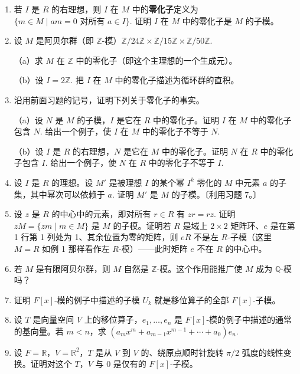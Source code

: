 \begin{enumerate}
\item 若 \(I\) 是 \(R\) 的右理想，则 \(I\) 在 \(M\) 中的\textbf{零化子}定义为 \(\{m \in M \mid am = 0 \text{ 对所有 } a \in I\}\). 证明 \(I\) 在 \(M\) 中的零化子是 \(M\) 的子模。

\item 设 \(M\) 是阿贝尔群（即 \(\mathbb{Z}\)-模）\(\mathbb{Z}/24\mathbb{Z} \times \mathbb{Z}/15\mathbb{Z} \times \mathbb{Z}/50\mathbb{Z}\).

（a）求 \(M\) 在 \(\mathbb{Z}\) 中的零化子（即这个主理想的一个生成元）。

（b）设 \(I = 2\mathbb{Z}\). 把 \(I\) 在 \(M\) 中的零化子描述为循环群的直积。

\item 沿用前面习题的记号，证明下列关于零化子的事实。

（a）设 \(N\) 是 \(M\) 的子模，\(I\) 是它在 \(R\) 中的零化子。证明 \(I\) 在 \(M\) 中的零化子包含 \(N\). 给出一个例子，使 \(I\) 在 \(M\) 中的零化子不等于 \(N\).

（b）设 \(I\) 是 \(R\) 的右理想，\(N\) 是它在 \(M\) 中的零化子。证明 \(N\) 在 \(R\) 中的零化子包含 \(I\). 给出一个例子，使 \(N\) 在 \(R\) 中的零化子不等于 \(I\).

\item 设 \(I\) 是 \(R\) 的理想。设 \(M'\) 是被理想 \(I\) 的某个幂 \(I^k\) 零化的 \(M\) 中元素 \(a\) 的子集，其中幂次可以依赖于 \(a\). 证明 \(M'\) 是 \(M\) 的子模。〔利用习题 7。〕

\item 设 \(z\) 是 \(R\) 的中心中的元素，即对所有 \(r \in R\) 有 \(zr = rz\). 证明 \(zM = \{zm \mid m \in M\}\) 是 \(M\) 的子模。证明若 \(R\) 是域上 \(2 \times 2\) 矩阵环、\(e\) 是在第 1 行第 1 列处为 1、其余位置为零的矩阵，则 \(eR\) 不是左 \(R\)-子模（这里 \(M = R\) 如例 1 那样看作左 \(R\)-模）——此时矩阵 \(e\) 不在 \(R\) 的中心中。

\item 若 \(M\) 是有限阿贝尔群，则 \(M\) 自然是 \(\mathbb{Z}\)-模。这个作用能推广使 \(M\) 成为 \(\mathbb{Q}\)-模吗？

\item 证明 \(F[x]\)-模的例子中描述的子模 \(U_k\) 就是移位算子的全部 \(F[x]\)-子模。

\item 设 \(T\) 是向量空间 \(V\) 上的移位算子，\(e_1, \ldots, e_n\) 是 \(F[x]\)-模的例子中描述的通常的基向量。若 \(m < n\)，求 \((a_mx^m+a_{m-1}x^{m-1}+\cdots+a_0)e_n\).

\item 设 \(F = \mathbb{R}\)，\(V = \mathbb{R}^2\)，\(T\) 是从 \(V\) 到 \(V\) 的、绕原点顺时针旋转 \(\pi/2\) 弧度的线性变换。证明对这个 \(T\)，\(V\) 与 0 是仅有的 \(F[x]\)-子模。


\end{enumerate}
